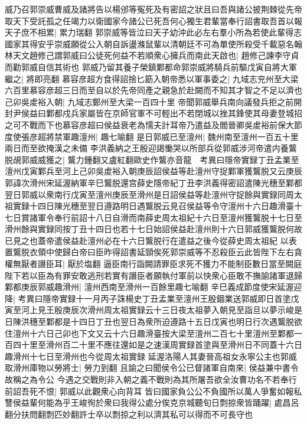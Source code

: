 威乃召郭崇威曹威及諸將告以楊邠等寃死及有密詔之狀且曰吾與諸公披荆棘從先帝取天下受託孤之任竭力以衛國家今諸公已死吾何心獨生君輩當奉行詔書取吾首以報天子庶不相累|{
	累力瑞翻}
郭崇威等皆泣曰天子幼沖此必左右羣小所為若使此輩得志國家其得安乎崇威願從公入朝自訴盪滌鼠輩以清朝廷不可為單使所殺受千載惡名翰林天文趙修己謂郭威曰公徒死何益不若順衆心擁兵而南此天啟也|{
	趙修己諫李守貞而勸郭威自信其術也}
郭威乃留其養子榮鎮鄴都命郭崇威將騎兵前驅戊寅自將大軍繼之|{
	將即亮翻}
慕容彦超方食得詔捨匕筯入朝帝悉以軍事委之|{
	九域志兖州至大梁六百里慕容彦超三日而至自以於先帝同產之親急於赴闕而不知其才智之不足以濟也}
己卯吳䖍裕入朝|{
	九域志鄭州至大梁一百四十里}
帝聞郭威舉兵南向議發兵拒之前開封尹侯益曰鄴都戍兵家屬皆在京師官軍不可輕出不若閉城以挫其鋒使其母妻登城招之可不戰而下也慕容彦超曰侯益衰老為懦夫計耳帝乃遣益及閻晉卿吳䖍裕前保大節度使張彦超將禁軍趣澶州|{
	趣七喻翻}
是日郭威已至澶州|{
	魏州南至澶州一百五十里兩日而至欲掩漢之未備}
李洪義納之王殷迎謁慟哭以所部兵從郭威涉河帝遣内養鸗脱覘郭威威獲之|{
	鸗力鍾翻又盧紅翻歐史作鸗亦音龍　考異曰隱帝實録丁丑孟業至澶州戊寅鄴兵至河上己卯吳䖍裕入朝庚辰詔侯益等赴澶州守捉鄴軍獲鸗脱又云庚辰郭諱次滑州宋延渥納軍辛巳鸗脱還宫薛史隱帝紀丁丑李洪義得密詔遣陳光穗至鄴都翌日郭威以衆南行戊寅至澶州庚辰至滑州是日詔侯益等赴澶州守捉餘與實録同周太祖實録十四日陳光穗至翌日遵路明日遇鸗脱云見召侯益等令守澶州十六日趣滑臺十七日賞諸軍令奉行前詔十八日自滑而南薛史周太祖紀十六日至澶州獲鸗脱十七日至滑州餘與實録同按丁丑十四日也若十七日始詔侯益赴澶州則十六日郭威獲鸗脱何故已見之也蓋帝遣侯益赴澶州必在十六日鸗脱行在遣益之後今從薛史周太祖紀}
以表置鸗脱衣領中使歸白帝曰臣昨得詔書延頸俟死郭崇威等不忍殺臣云此皆陛下左右貪權無厭者譖臣耳|{
	厭於塩翻}
逼臣南行詣闕請罪臣求死不獲力不能制臣數日當至闕庭陛下若以臣為有罪安敢逃刑若實有譖臣者願執付軍前以快衆心臣敢不撫諭諸軍退歸鄴都庚辰郭威趣滑州|{
	澶州西南至滑州一百餘里趣七喻翻}
辛巳義成節度使宋延渥迎降|{
	考異曰隱帝實録十一月丙子誅楊史丁丑孟業至澶州王殷錮業送郭威即日首塗戊寅至河上見王殷庚辰次滑州周太祖實録云十三日夜太祖夢入朝見至詣旦以夢示峻是日陳洪穗至鄴都是十四日丁丑也翌日為衆所迫遵路十五日戊寅也明日行次遇鸗脱欲住澶州十六日己卯也下文又云十六日趣滑臺按大梁至澶州二百七十里澶州至鄴都一百四十里至滑州百二十里不應往還如是之速漢周實録首塗與至滑州日不同蓋十六日趣滑州十七日至滑州也今從周太祖實録}
延渥洛陽人其妻晉高祖女永寧公主也郭威取滑州庫物以勞將士|{
	勞力到翻}
且諭之曰聞侯令公已督諸軍自南來|{
	侯益兼中書令故稱之為令公}
今遇之交戰則非入朝之義不戰則為其所屠吾欲全汝曹功名不若奉行前詔吾死不恨|{
	郭威以此觀衆心向背耳}
皆曰國家負公公不負國所以萬人爭奮如報私讐侯益輩何能為乎王峻徇於衆曰我得公處分俟克京城聽旬日剽掠衆皆踊躍|{
	處昌呂翻分扶問翻剽匹妙翻許士卒以剽掠之利以濟其私可以得而不可長守也}

